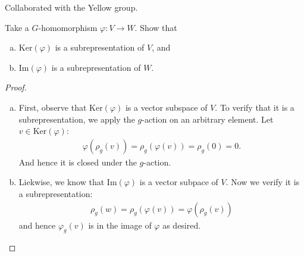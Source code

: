 \documentclass[num=5,duedate=03-10-21,course=Algebra\ II,proflastname=Walton]{hwtemplate}
\begin{document}

% 

\maketitle
Collaborated with the Yellow group.
\pagebreak
\problem[1]
\begin{claim}
Take a \(G\)-homomorphism \(\varphi:V\to W\). Show that
\begin{enumerate}[(a).]
	\item \(\textrm{Ker}(\varphi)\) is a subrepresentation of \(V\), and
	\item \(\textrm{Im}(\varphi)\) is a subrepresentation of \(W\).
\end{enumerate}
\end{claim}

\begin{proof}
	\begin{enumerate}[(a).]
		\item First, observe that \(\textrm{Ker}(\varphi )\) is a vector subspace of \(V\). To verify that it is a subrepresentation, we apply the \(g\)-action on an arbitrary element. Let \(v \in \textrm{Ker}(\varphi )\):
			\begin{align*}
				\varphi (\rho_g(v)) = \rho_g(\varphi (v)) = \rho_g(0) = 0.
			\end{align*}
			And hence it is closed under the \(g\)-action.
		\item Liekwise, we know that \(\textrm{Im}(\varphi )\) is a vector subpace of \(V\). Now we verify it is a subrepresentation:
			\begin{align*}
				\rho_g(w) = \rho _g(\varphi (v)) = \varphi (\rho_g (v))
			\end{align*}
			and hence \(\varphi_g(v)\) is in the image of \(\varphi \) as desired.
	\end{enumerate}
\end{proof}
\end{document}
